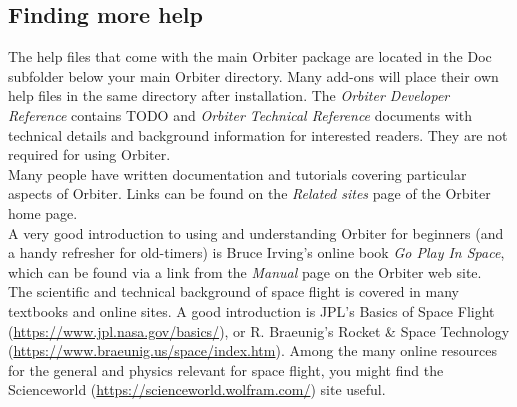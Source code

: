 \documentclass[Orbiter User Manual.tex]{subfiles}
\begin{document}
\subsection{Finding more help}
The help files that come with the main Orbiter package are located in the Doc subfolder below your main Orbiter directory. Many add-ons will place their own help files in the same directory after installation. The \textit{Orbiter Developer Reference} contains TODO and \textit{Orbiter Technical Reference} documents with technical details and background information for interested readers. They are not required for using Orbiter.\\
Many people have written documentation and tutorials covering particular aspects of Orbiter. Links can be found on the \textit{Related sites} page of the Orbiter home page.\\
A very good introduction to using and understanding Orbiter for beginners (and a handy refresher for old-timers) is Bruce Irving's online book \textit{Go Play In Space}, which can be found via a link from the \textit{Manual} page on the Orbiter web site.\\
The scientific and technical background of space flight is covered in many textbooks and online sites. A good introduction is JPL's Basics of Space Flight (\url{https://www.jpl.nasa.gov/basics/}), or R. Braeunig's Rocket \& Space Technology (\url{https://www.braeunig.us/space/index.htm}). Among the many online resources for the general and physics relevant for space flight, you might find the Scienceworld (\url{https://scienceworld.wolfram.com/}) site useful.
\end{document}
